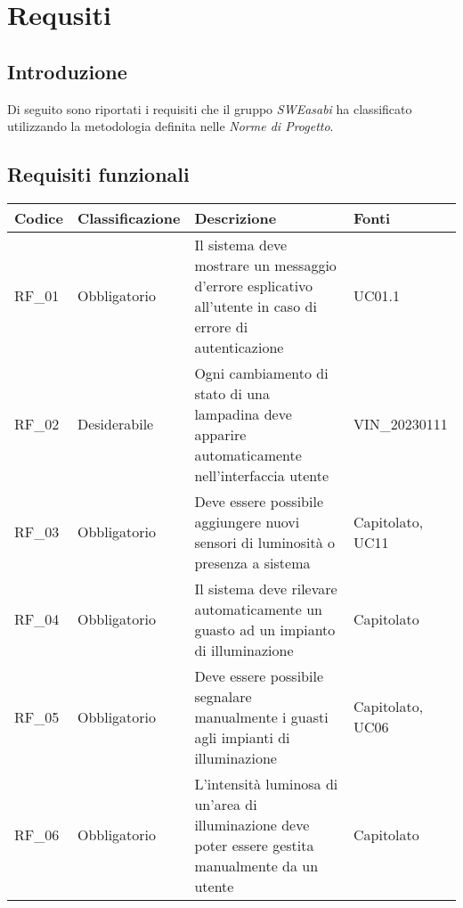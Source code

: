 \chapter{Requsiti}

\section{Introduzione}
Di seguito sono riportati i requisiti che il gruppo \textit{SWEasabi} ha classificato utilizzando la metodologia definita nelle \textit{Norme di Progetto}.

\section{Requisiti funzionali}

\begin{center}
    \begin{xltabular}{\linewidth}{|l|l|X|l|}
        \hline
        \textbf{Codice} & \textbf{Classificazione} & \textbf{Descrizione} & \textbf{Fonti} \\
        \hline
        RF\_01 & Obbligatorio & Il sistema deve mostrare un messaggio d'errore esplicativo all'utente in caso di errore di autenticazione & UC01.1 \\

        \hline
        RF\_02 & Desiderabile &Ogni cambiamento di stato di una lampadina deve apparire automaticamente nell'interfaccia utente & VIN\_20230111\\

        \hline
        RF\_03 & Obbligatorio & Deve essere possibile aggiungere nuovi sensori di luminosità o presenza a sistema & Capitolato, UC11 \\

        \hline
        RF\_04 & Obbligatorio & Il sistema deve rilevare automaticamente un guasto ad un impianto di illuminazione & Capitolato\\
        
        \hline
        RF\_05 & Obbligatorio & Deve essere possibile segnalare manualmente i guasti agli impianti di illuminazione & Capitolato, UC06 \\

        \hline
        RF\_06 & Obbligatorio & L'intensità luminosa di un'area di illuminazione deve poter essere gestita manualmente da un utente & Capitolato\\


\end{xltabular}
\end{center}

